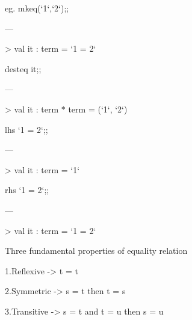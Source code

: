 \documentclass[12pt]{article}
\renewcommand{\_}{\kern-1.5pt\textunderscore\kern-1.5pt}
\begin{document}
\vspace{\baselineskip}
{\fontsize{13pt}{15.6pt}\selectfont eg. mk\_eq(`1`,`2`);;\par}\par

{\fontsize{14pt}{16.8pt}\selectfont —{\fontsize{13pt}{15.6pt}\selectfont > val it : term = `1 = 2`\par}\par}\par

{\fontsize{13pt}{15.6pt}\selectfont dest\_eq it;;\par}\par

{\fontsize{14pt}{16.8pt}\selectfont —{\fontsize{13pt}{15.6pt}\selectfont > val it : term $\ast$  term = (`1`, `2`)\par}\par}\par

{\fontsize{13pt}{15.6pt}\selectfont lhs `1 = 2`;;\par}\par

{\fontsize{14pt}{16.8pt}\selectfont —{\fontsize{13pt}{15.6pt}\selectfont > val it : term = `1`\par}\par}\par

{\fontsize{13pt}{15.6pt}\selectfont rhs `1 = 2`;;\par}\par

{\fontsize{14pt}{16.8pt}\selectfont —{\fontsize{13pt}{15.6pt}\selectfont > val it : term = `1 = 2`\par}\par}\par


\vspace{\baselineskip}
{\fontsize{13pt}{15.6pt}\selectfont Three fundamental properties of equality relation\par}\par

{\fontsize{13pt}{15.6pt}\selectfont 1.Reflexive -> t = t\par}\par

{\fontsize{13pt}{15.6pt}\selectfont 2.Symmetric -> s = t then t = s\par}\par

{\fontsize{13pt}{15.6pt}\selectfont 3.Transitive -> s = t and t = u then s = u\par}\par
\end{document}
